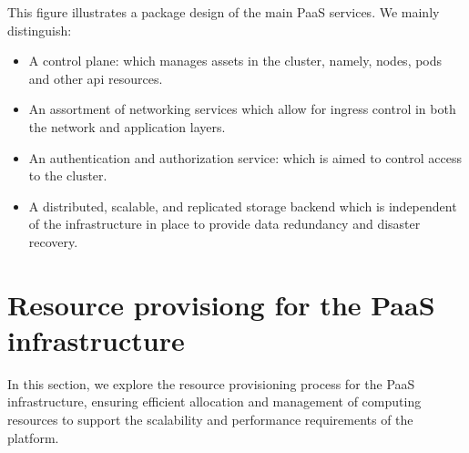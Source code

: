 \hspace{7mm}This figure illustrates a package design of the main PaaS services. We mainly distinguish: 
\begin{itemize}[label={--}]
\item  A control plane: which manages assets in the cluster, namely, nodes, pods and other api resources. 
\item An assortment of networking services which allow for ingress control in both the network and application layers. 
\item An authentication and authorization service: which is aimed to control access to the cluster. 
\item A distributed, scalable, and replicated storage backend which is independent of the infrastructure in place to provide data redundancy and disaster recovery. 
\end{itemize}
\newpage
\section{Resource provisiong for the PaaS infrastructure}

\hspace{7mm}In this section, we explore the resource provisioning process for the PaaS infrastructure, ensuring efficient allocation and management of computing resources to support the scalability and performance requirements of the platform.

